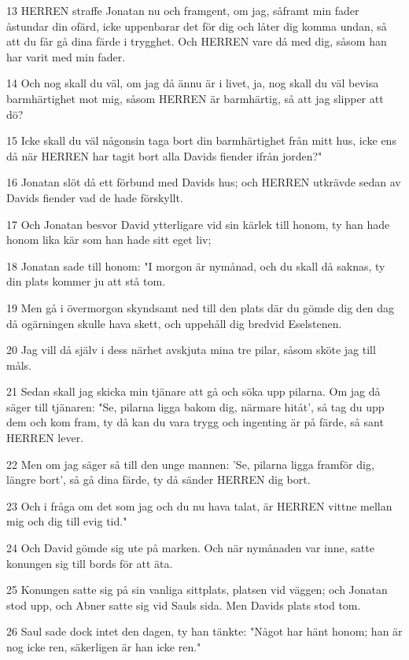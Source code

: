 \par 13 HERREN straffe Jonatan nu och framgent, om jag, såframt min fader åstundar din ofärd, icke uppenbarar det för dig och låter dig komma undan, så att du får gå dina färde i trygghet. Och HERREN vare då med dig, såsom han har varit med min fader.
\par 14 Och nog skall du väl, om jag då ännu är i livet, ja, nog skall du väl bevisa barmhärtighet mot mig, såsom HERREN är barmhärtig, så att jag slipper att dö?
\par 15 Icke skall du väl någonsin taga bort din barmhärtighet från mitt hus, icke ens då när HERREN har tagit bort alla Davids fiender ifrån jorden?"
\par 16 Jonatan slöt då ett förbund med Davids hus; och HERREN utkrävde sedan av Davids fiender vad de hade förskyllt.
\par 17 Och Jonatan besvor David ytterligare vid sin kärlek till honom, ty han hade honom lika kär som han hade sitt eget liv;
\par 18 Jonatan sade till honom: "I morgon är nymånad, och du skall då saknas, ty din plats kommer ju att stå tom.
\par 19 Men gå i övermorgon skyndsamt ned till den plats där du gömde dig den dag då ogärningen skulle hava skett, och uppehåll dig bredvid Eselstenen.
\par 20 Jag vill då själv i dess närhet avskjuta mina tre pilar, såsom sköte jag till måls.
\par 21 Sedan skall jag skicka min tjänare att gå och söka upp pilarna. Om jag då säger till tjänaren: "Se, pilarna ligga bakom dig, närmare hitåt', så tag du upp dem och kom fram, ty då kan du vara trygg och ingenting är på färde, så sant HERREN lever.
\par 22 Men om jag säger så till den unge mannen: 'Se, pilarna ligga framför dig, längre bort', så gå dina färde, ty då sänder HERREN dig bort.
\par 23 Och i fråga om det som jag och du nu hava talat, är HERREN vittne mellan mig och dig till evig tid."
\par 24 Och David gömde sig ute på marken. Och när nymånaden var inne, satte konungen sig till bords för att äta.
\par 25 Konungen satte sig på sin vanliga sittplats, platsen vid väggen; och Jonatan stod upp, och Abner satte sig vid Sauls sida. Men Davids plats stod tom.
\par 26 Saul sade dock intet den dagen, ty han tänkte: "Något har hänt honom; han är nog icke ren, säkerligen är han icke ren."
